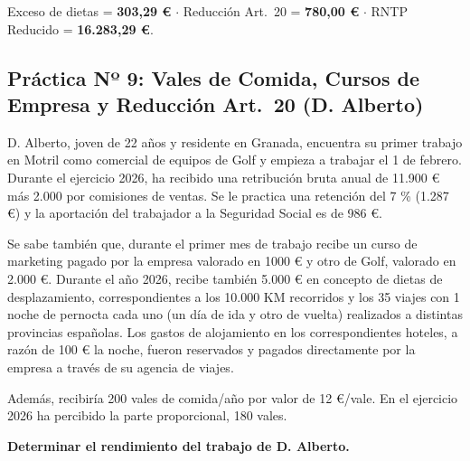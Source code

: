\documentclass[11pt,a4paper,openany]{article}
\begin{document}
\begin{resultadoBox}
Exceso de dietas = \textbf{303,29 \euro} $\cdot$ Reducción Art.~20 = \textbf{780,00 \euro} $\cdot$ RNTP Reducido = \textbf{16.283,29 \euro}.
\end{resultadoBox}

\vspace{0.4cm}

\subsection{Práctica Nº 9: Vales de Comida, Cursos de Empresa y Reducción Art.~20 (D. Alberto)}

\begin{enunciadoBox}
D. Alberto, joven de 22 años y residente en Granada, encuentra su primer trabajo en Motril como comercial de equipos de Golf y empieza a trabajar el 1 de febrero. Durante el ejercicio 2026, ha recibido una retribución bruta anual de 11.900 \euro{} más 2.000 por comisiones de ventas. Se le practica una retención del 7 \% (1.287 \euro{}) y la aportación del trabajador a la Seguridad Social es de 986 \euro{}.

Se sabe también que, durante el primer mes de trabajo recibe un curso de marketing pagado por la empresa valorado en 1000 \euro{} y otro de Golf, valorado en 2.000 \euro{}. Durante el año 2026, recibe también 5.000 \euro{} en concepto de dietas de desplazamiento, correspondientes a los 10.000 KM recorridos y los 35 viajes con 1 noche de pernocta cada uno (un día de ida y otro de vuelta) realizados a distintas provincias españolas. Los gastos de alojamiento en los correspondientes hoteles, a razón de 100 \euro{} la noche, fueron reservados y pagados directamente por la empresa a través de su agencia de viajes.

Además, recibiría 200 vales de comida/año por valor de 12 \euro{}/vale. En el ejercicio 2026 ha percibido la parte proporcional, 180 vales.

\textbf{Determinar el rendimiento del trabajo de D. Alberto.}
\end{enunciadoBox}
\end{document}
